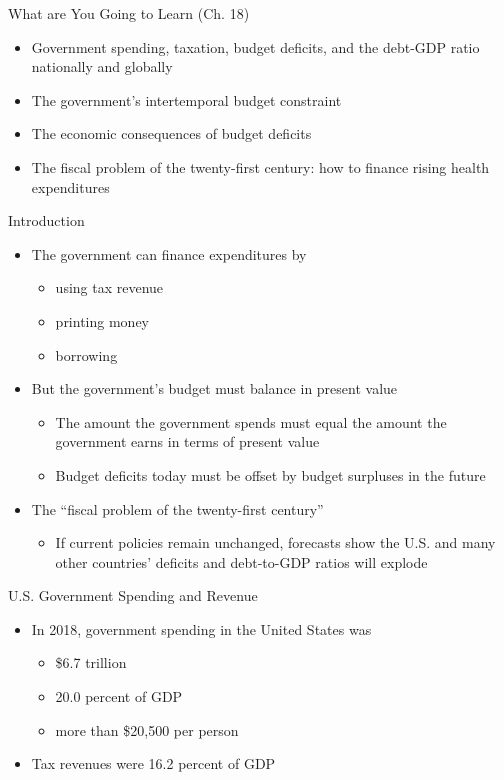 \documentclass[aspectratio=1610]{beamer}
\begin{document}
\begin{frame}[wide]{What are You Going to Learn (Ch. 18)}
	\begin{itemize}
		\item Government spending, taxation, budget deficits, and the debt-GDP ratio nationally and globally
		\item The government’s intertemporal budget constraint
		\item The economic consequences of budget deficits
		\item The fiscal problem of the twenty-first century: how to finance rising health expenditures
	\end{itemize}
\end{frame}

\begin{frame}[wide]{Introduction}
	\begin{itemize}
		\item The government can finance expenditures by
		\begin{itemize}
			\item using tax revenue
			\item printing money
			\item borrowing
		\end{itemize}
		\item But the government’s budget must balance in present value
		\begin{itemize}
			\item The amount the government spends must equal the amount the government earns in terms of present value
			\item Budget deficits today must be offset by budget surpluses in the future
		\end{itemize}
		\item The “fiscal problem of the twenty-first century” 
		\begin{itemize}
			\item If current policies remain unchanged, forecasts show the U.S. and many other countries' deficits and debt-to-GDP ratios will explode
		\end{itemize}
		
	\end{itemize}
\end{frame}

\begin{frame}[wide]{U.S. Government Spending and Revenue}
	\begin{itemize}
		\item In 2018, government spending in the United States was 
		\begin{itemize}
			\item \$6.7 trillion
			\item 20.0 percent of GDP
			\item more than \$20,500 per person
		\end{itemize}
		\item Tax revenues were 16.2 percent of GDP 
	\end{itemize}
\end{frame}
\end{document}

